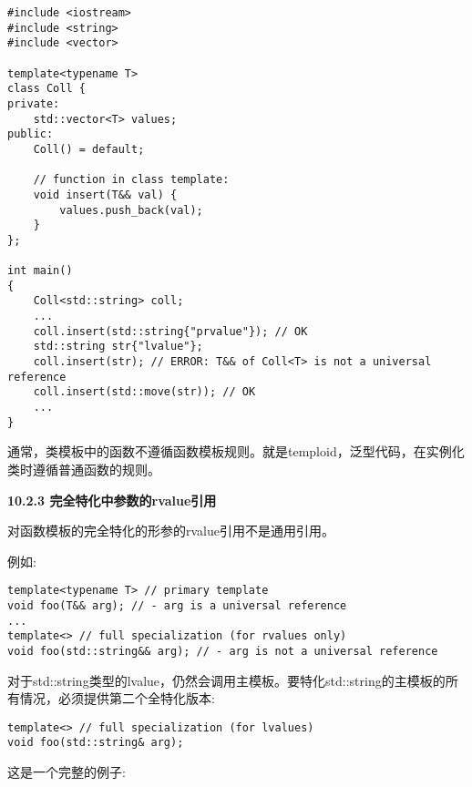 \begin{lstlisting}[caption={}]
#include <iostream>
#include <string>
#include <vector>

template<typename T>
class Coll {
private:
	std::vector<T> values;
public:
	Coll() = default;
	
	// function in class template:
	void insert(T&& val) {
		values.push_back(val);
	}
};

int main()
{
	Coll<std::string> coll;
	...
	coll.insert(std::string{"prvalue"}); // OK
	std::string str{"lvalue"};
	coll.insert(str); // ERROR: T&& of Coll<T> is not a universal reference
	coll.insert(std::move(str)); // OK
	...
}
\end{lstlisting}

通常，类模板中的函数不遵循函数模板规则。就是temploid，泛型代码，在实例化类时遵循普通函数的规则。\par

\hspace*{\fill} \par %
\textbf{10.2.3 完全特化中参数的rvalue引用}

对函数模板的完全特化的形参的rvalue引用不是通用引用。\par

例如:\par

\begin{lstlisting}[caption={}]
template<typename T> // primary template
void foo(T&& arg); // - arg is a universal reference
...
template<> // full specialization (for rvalues only)
void foo(std::string&& arg); // - arg is not a universal reference
\end{lstlisting}

对于std::string类型的lvalue，仍然会调用主模板。要特化std::string的主模板的所有情况，必须提供第二个全特化版本:\par

\begin{lstlisting}[caption={}]
template<> // full specialization (for lvalues)
void foo(std::string& arg);
\end{lstlisting}

这是一个完整的例子:\par

{\color{red}{generic/universalspec.cpp}}\par

